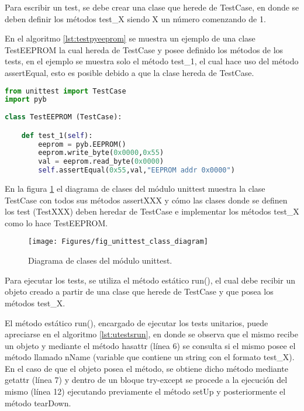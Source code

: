 Para escribir un test, se debe crear una clase que herede de TestCase, en donde se deben definir los métodos test\_X siendo X un número comenzando de 1.

En el algoritmo \ref{lst:testpyeeprom} se muestra un ejemplo de una clase TestEEPROM la cual hereda de TestCase y posee definido los métodos de los tests, en el ejemplo se muestra solo el método test\_1, el cual hace uso del método assertEqual, esto es posible debido a que la clase hereda de TestCase.

\begin{lstlisting}[label={lst:testpyeeprom},caption=Clase que hereda de TestCase donde se definen los métodos de test para la EEPROM., language={python}]
from unittest import TestCase
import pyb
  
class TestEEPROM (TestCase):

    def test_1(self):
        eeprom = pyb.EEPROM()
        eeprom.write_byte(0x0000,0x55)
        val = eeprom.read_byte(0x0000)
        self.assertEqual(0x55,val,"EEPROM addr 0x0000")       
\end{lstlisting}

En la figura \ref{fig:unittestpythonclassd} el diagrama de clases del módulo unittest muestra la clase TestCase con todos sus métodos assertXXX y cómo las clases donde se definen los test (TestXXX) deben heredar de TestCase e implementar los métodos test\_X como lo hace TestEEPROM.

\begin{figure}[ht]
  \centering
    \texttt{[image: Figures/fig\_unittest\_class\_diagram]}
  \caption{Diagrama de clases del módulo unittest.}
  \label{fig:unittestpythonclassd}
\end{figure}

Para ejecutar los tests, se utiliza el método estático run(), el cual debe recibir un objeto creado a partir de una clase que herede de TestCase y que posea los métodos test\_X.

El método estático run(), encargado de ejecutar los tests unitarios, puede apreciarse en el algoritmo \ref{lst:utestsrun}, en donde se observa que el mismo recibe un objeto y mediante el método hasattr (línea 6) se consulta si el mismo posee el método llamado nName (variable que contiene un string con el formato test\_X). En el caso de que el objeto posea el método, se obtiene dicho método mediante getattr (línea 7) y dentro de un bloque try-except se procede a la ejecución del mismo (línea 12) ejecutando previamente el método setUp y posteriormente el método tearDown.

